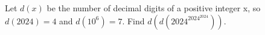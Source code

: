 Let $d(x)$ be the number of decimal digits of a positive integer x, so $d(2024)=4$ and $d(10^6)=7$. Find $d(d(2024^{2024^{2024}}))$.
